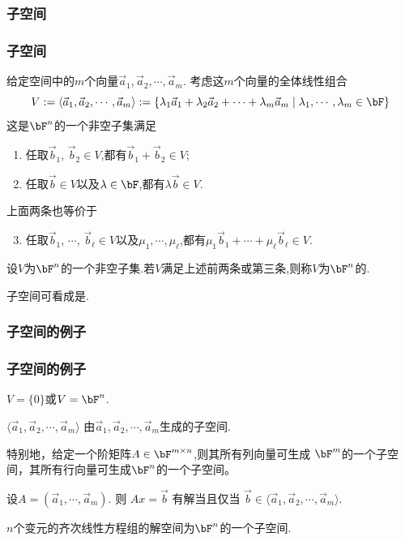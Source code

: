 \subsubsection{子空间}
\begin{frame}\frametitle{子空间}
\pp
给定空间中的$m$个向量$\vec{a}_1,\vec{a}_2,\cdots,\vec{a}_m$.
\pp
考虑这$m$个向量的全体线性组合
\[V:=\langle\vec{a}_1,\vec{a}_2,\cdots,\vec{a}_m\rangle:=\{\lambda_1\vec{a}_1+\lambda_2\vec{a}_2+\cdots+\lambda_m\vec{a}_m\mid \lambda_1,\cdots,\lambda_m\in \bF\}\]
\pp
这是$\bF^n$的一个非空子集满足
\begin{enumerate}
\item 任取$\vec{b}_1$, $\vec{b}_2\in V$,都有$\vec{b}_1+\vec{b}_2\in V$;
\pp
\item 任取$\vec{b}\in V$以及$\lambda\in \bF$,都有$\lambda\vec{b}\in V$.
\end{enumerate}
\pp
上面两条也等价于
\begin{enumerate}\setcounter{enumi}{2}
\item 任取$\vec{b}_1$, $\cdots$, $\vec{b}_\ell\in V$以及$\mu_1,\cdots,\mu_\ell$,都有$\mu_1\vec{b}_1+\cdots+\mu_\ell\vec{b}_\ell\in V$.
\end{enumerate}
\pp
\begin{definition}
设$V$为$\bF^n$的一个非空子集.若$V$满足上述前两条或第三条,则称$V$为$\bF^n$的.
\end{definition}
\pp
子空间可看成是.
\end{frame}




\renewcommand{\mydate}{2025年04月08号\ 第十三次课}


\subsubsection{子空间的例子}
\begin{frame}\frametitle{子空间的例子}

\begin{example}[平凡子空间]
$V=\{0\}$或$V=\bF^n$.
\end{example}
\pp
\begin{example}[生成子空间]
$\langle\vec{a}_1,\vec{a}_2,\cdots,\vec{a}_m\rangle$ 由$\vec{a}_1,\vec{a}_2,\cdots,\vec{a}_m$生成的子空间.
\end{example}

\pp

特别地，给定一个阶矩阵$A\in\bF^{m\times n}$,则其所有列向量可生成 $\bF^m$的一个子空间，其所有行向量可生成$\bF^n$的一个子空间。
\pp

\begin{example}[用子空间的观点来理解线性方程组]
设$A=(\vec{a}_1,\cdots,\vec{a}_m)$. 则 $Ax=\vec{b}$ 有解当且仅当 $\vec{b}\in \langle\vec{a}_1,\vec{a}_2,\cdots,\vec{a}_m\rangle$.
\end{example}
\pp

\begin{example}[齐次线性方程组的解空间]
$n$个变元的齐次线性方程组的解空间为$\bF^n$的一个子空间.
\end{example}
\end{frame}





